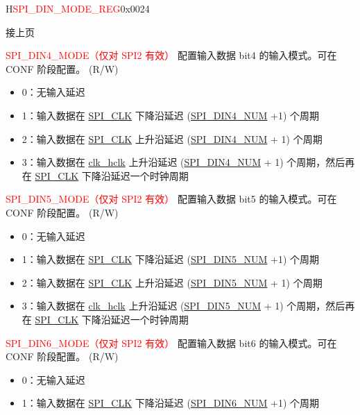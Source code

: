 \addtocounter{Regfloat}{-1}
\begin{register}{H}{\textcolor{red}{SPI\_DIN\_MODE\_REG}}{0x{}0024}
\begin{regdesc}\begin{reglist}
\item [接上页]

\label{fielddesc:SPIDIN4MODE}\item [\textcolor{red}{SPI\_DIN4\_MODE（仅对 SPI2 有效）}] 配置输入数据 bit4 的输入模式。可在 CONF 阶段配置。 (R/W)
\begin{itemize}
    \item 0：无输入延迟
    \item 1：输入数据在 \hyperref[clk:SPICLK]{SPI\_CLK} 下降沿延迟 (\hyperref[fielddesc:SPIDIN0NUM]{SPI\_DIN4\_NUM} +1) 个周期
    \item 2：输入数据在 \hyperref[clk:SPICLK]{SPI\_CLK} 上升沿延迟 (\hyperref[fielddesc:SPIDIN0NUM]{SPI\_DIN4\_NUM} + 1) 个周期
    \item 3：输入数据在 \hyperref[clk:clkhclk]{clk\_hclk} 上升沿延迟 (\hyperref[fielddesc:SPIDIN0NUM]{SPI\_DIN4\_NUM} + 1) 个周期，然后再在 \hyperref[clk:SPICLK]{SPI\_CLK} 下降沿延迟一个时钟周期
\end{itemize}
\label{fielddesc:SPIDIN5MODE}\item [\textcolor{red}{SPI\_DIN5\_MODE（仅对 SPI2 有效）}] 配置输入数据 bit5 的输入模式。可在 CONF 阶段配置。 (R/W)
\begin{itemize}
    \item 0：无输入延迟
    \item 1：输入数据在 \hyperref[clk:SPICLK]{SPI\_CLK} 下降沿延迟 (\hyperref[fielddesc:SPIDIN0NUM]{SPI\_DIN5\_NUM} +1) 个周期
    \item 2：输入数据在 \hyperref[clk:SPICLK]{SPI\_CLK} 上升沿延迟 (\hyperref[fielddesc:SPIDIN0NUM]{SPI\_DIN5\_NUM} + 1) 个周期
    \item 3：输入数据在 \hyperref[clk:clkhclk]{clk\_hclk} 上升沿延迟 (\hyperref[fielddesc:SPIDIN0NUM]{SPI\_DIN5\_NUM} + 1) 个周期，然后再在 \hyperref[clk:SPICLK]{SPI\_CLK} 下降沿延迟一个时钟周期
\end{itemize}
\label{fielddesc:SPIDIN6MODE}\item [\textcolor{red}{SPI\_DIN6\_MODE（仅对 SPI2 有效）}] 配置输入数据 bit6 的输入模式。可在 CONF 阶段配置。 (R/W)
\begin{itemize}
    \item 0：无输入延迟
    \item 1：输入数据在 \hyperref[clk:SPICLK]{SPI\_CLK} 下降沿延迟 (\hyperref[fielddesc:SPIDIN0NUM]{SPI\_DIN6\_NUM} +1) 个周期

\end{itemize}
\end{reglist}
\end{regdesc}
\end{register}
